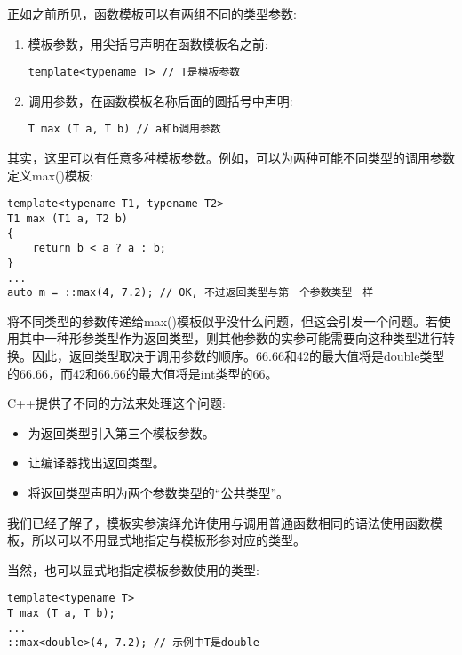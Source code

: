 
正如之前所见，函数模板可以有两组不同的类型参数:

\begin{enumerate}
\item 
模板参数，用尖括号声明在函数模板名之前:
\begin{lstlisting}[style=styleCXX]
template<typename T> // T是模板参数
\end{lstlisting}

\item 
调用参数，在函数模板名称后面的圆括号中声明:
\begin{lstlisting}[style=styleCXX]
T max (T a, T b) // a和b调用参数
\end{lstlisting}
\end{enumerate}

其实，这里可以有任意多种模板参数。例如，可以为两种可能不同类型的调用参数定义max()模板:

\begin{lstlisting}[style=styleCXX]
template<typename T1, typename T2>
T1 max (T1 a, T2 b)
{
	return b < a ? a : b;
}
...
auto m = ::max(4, 7.2); // OK, 不过返回类型与第一个参数类型一样
\end{lstlisting}

将不同类型的参数传递给max()模板似乎没什么问题，但这会引发一个问题。若使用其中一种形参类型作为返回类型，则其他参数的实参可能需要向这种类型进行转换。因此，返回类型取决于调用参数的顺序。66.66和42的最大值将是double类型的66.66，而42和66.66的最大值将是int类型的66。

C++提供了不同的方法来处理这个问题:

\begin{itemize}
\item
为返回类型引入第三个模板参数。

\item
让编译器找出返回类型。

\item
将返回类型声明为两个参数类型的“公共类型”。
\end{itemize}


我们已经了解了，模板实参演绎允许使用与调用普通函数相同的语法使用函数模板，所以可以不用显式地指定与模板形参对应的类型。

当然，也可以显式地指定模板参数使用的类型:

\begin{lstlisting}[style=styleCXX]
template<typename T>
T max (T a, T b);
...
::max<double>(4, 7.2); // 示例中T是double
\end{lstlisting}

